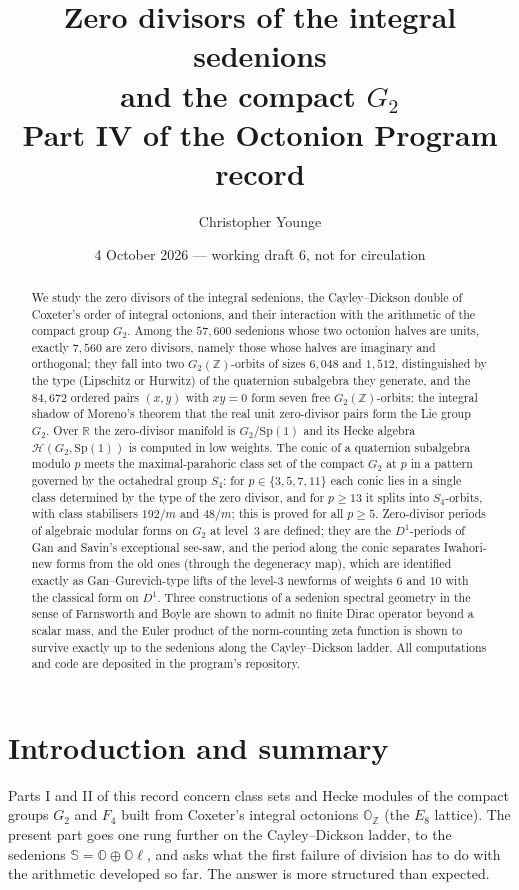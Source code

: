\documentclass[11pt]{amsart}
\title[Zero divisors of the integral sedenions]{Zero divisors of the integral sedenions\\ and the compact $G_2$\\[4pt] {\normalsize Part IV of the Octonion Program record}}
\author{Christopher Younge}
\date{4 October 2026 --- working draft 6, not for circulation}
\theoremstyle{definition}
\renewcommand{\O}{\mathbb{O}}\newcommand{\Sd}{\mathbb{S}}\newcommand{\Hq}{\mathbb{H}}\newcommand{\Z}{\mathbb{Z}}\newcommand{\Q}{\mathbb{Q}}\newcommand{\R}{\mathbb{R}}\newcommand{\C}{\mathbb{C}}\newcommand{\F}{\mathbb{F}}
\begin{document}
\begin{abstract}
We study the zero divisors of the integral sedenions, the Cayley--Dickson double of Coxeter's order of integral octonions, and their interaction with the arithmetic of the compact group $G_2$. Among the $57{,}600$ sedenions whose two octonion halves are units, exactly $7{,}560$ are zero divisors, namely those whose halves are imaginary and orthogonal; they fall into two $G_2(\Z)$-orbits of sizes $6{,}048$ and $1{,}512$, distinguished by the type (Lipschitz or Hurwitz) of the quaternion subalgebra they generate, and the $84{,}672$ ordered pairs $(x,y)$ with $xy=0$ form seven free $G_2(\Z)$-orbits: the integral shadow of Moreno's theorem that the real unit zero-divisor pairs form the Lie group $G_2$. Over $\R$ the zero-divisor manifold is $G_2/\mathrm{Sp}(1)$ and its Hecke algebra $\mathcal H(G_2,\mathrm{Sp}(1))$ is computed in low weights. The conic of a quaternion subalgebra modulo $p$ meets the maximal-parahoric class set of the compact $G_2$ at $p$ in a pattern governed by the octahedral group $S_4$: for $p\in\{3,5,7,11\}$ each conic lies in a single class determined by the type of the zero divisor, and for $p\ge 13$ it splits into $S_4$-orbits, with class stabilisers $192/m$ and $48/m$; this is proved for all $p\ge 5$. Zero-divisor periods of algebraic modular forms on $G_2$ at level~3 are defined; they are the $D^1$-periods of Gan and Savin's exceptional see-saw, and the period along the conic separates Iwahori-new forms from the old ones (through the degeneracy map), which are identified exactly as Gan--Gurevich-type lifts of the level-$3$ newforms of weights $6$ and $10$ with the classical form on $D^1$. Three constructions of a sedenion spectral geometry in the sense of Farnsworth and Boyle are shown to admit no finite Dirac operator beyond a scalar mass, and the Euler product of the norm-counting zeta function is shown to survive exactly up to the sedenions along the Cayley--Dickson ladder. All computations and code are deposited in the program's repository.
\end{abstract}
\maketitle
\tableofcontents

\section{Introduction and summary}
Parts I and II of this record \cite{PartI,PartII} concern class sets and Hecke modules of the compact groups $G_2$ and $F_4$ built from Coxeter's integral octonions $\O_\Z$ (the $E_8$ lattice). The present part goes one rung further on the Cayley--Dickson ladder, to the sedenions $\Sd=\O\oplus\O\ell$, and asks what the first failure of division has to do with the arithmetic developed so far. The answer is more structured than expected.
\end{document}
